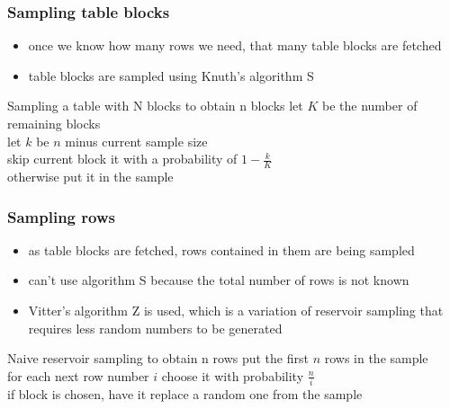 \documentclass{beamer}
\begin{document}
\begin{frame}
  \frametitle{Sampling table blocks}

  \begin{itemize}
  \item once we know how many rows we need, that many \alert{table blocks} are
    fetched
  \item table blocks are sampled using \alert{Knuth's algorithm S}
  \end{itemize}

  \begin{block}{Sampling a table with N blocks to obtain n blocks}
    \hspace*{2em}let $K$ be the number of remaining blocks\\
    \hspace*{2em}let $k$ be $n$ minus current sample size\\
    \hspace*{2em}skip current block it with a probability of $1 - \frac{k}{K}$\\
    \hspace*{2em}otherwise put it in the sample
  \end{block}
\end{frame}

\begin{frame}
  \frametitle{Sampling rows}

  \begin{itemize}
  \item as table \alert{blocks} are fetched, \alert{rows} contained in them are
    being sampled
  \item can't use algorithm S because the \alert{total number} of rows is not
    known
  \item \alert{Vitter's algorithm Z} is used, which is a variation of reservoir
    sampling that requires less random numbers to be generated
  \end{itemize}

  \begin{block}{Naive reservoir sampling to obtain n rows}
      \hspace*{2em}put the first $n$ rows in the sample\\
      \hspace*{2em}for each next row number $i$ choose it with probability $\frac{n}{i}$\\
      \hspace*{2em}if block is chosen, have it replace a random one from the sample
  \end{block}
\end{frame}
\end{document}
